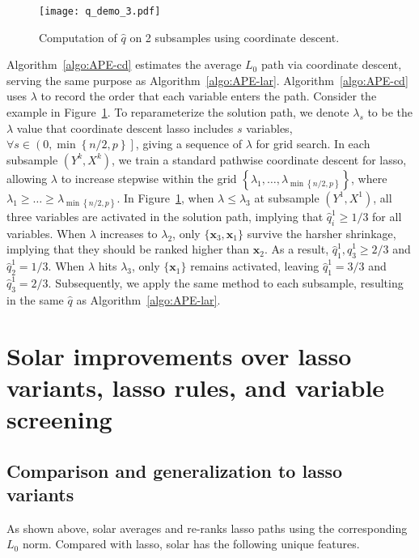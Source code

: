 \documentclass[11pt,review,authoryear]{elsarticle}
\begin{document}
\begin{figure}[h]
  \centering
  \texttt{[image: q\_demo\_3.pdf]}
  \caption{Computation of $\widehat{q}$ on 2 subsamples using coordinate descent.}
  \label{fig:q_demo_3}
\end{figure}

Algorithm~\ref{algo:APE-cd} estimates the average $L_0$ path via coordinate descent, serving the same purpose as Algorithm~\ref{algo:APE-lar}. Algorithm~\ref{algo:APE-cd} uses $\lambda$ to record the order that each variable enters the path. Consider the example in Figure~\ref{fig:q_demo_3}. To reparameterize the solution path, we denote $\lambda_s$ to be the $\lambda$ value that coordinate descent lasso includes $s$ variables, $\forall s\in \left( 0, \min \left\{ n/2, p \right\} \right]$, giving a sequence of $\lambda$ for grid search. In each subsample $\left( Y^k, X^k \right)$, we train a standard pathwise coordinate descent for lasso, allowing $\lambda$ to increase stepwise within the grid $\left\{\lambda_1, \ldots, \lambda_{ \min \left\{ n/2, p \right\} } \right\}$, where $\lambda_1 \geqslant \ldots \geqslant \lambda_{ \min \left\{ n/2, p \right\} }$. In Figure~\ref{fig:q_demo_3}, when $\lambda \leqslant \lambda_3$ at subsample $\left( Y^1, X^1 \right)$, all three variables are activated in the solution path, implying that $\widehat{q}^1_i \geqslant 1/3$ for all variables. When $\lambda$ increases to $\lambda_2$, only $\{\mathbf{x}_3, \mathbf{x}_1\}$ survive the harsher shrinkage, implying that they should be ranked higher than $\mathbf{x}_2$. As a result, $\widehat{q}^1_1, \widehat{q}^1_3 \geqslant 2/3$ and $\widehat{q}^1_2 = 1/3$. When $\lambda$ hits $\lambda_3$, only $\{\mathbf{x}_1\}$ remains activated, leaving $\widehat{q}^1_1 = 3/3$ and $\widehat{q}^1_3 = 2/3$. Subsequently, we apply the same method to each subsample, resulting in the same $\widehat{q}$ as Algorithm~\ref{algo:APE-lar}.

\section{Solar improvements over lasso variants, lasso rules, and variable screening \label{section:adv}}

\subsection{Comparison and generalization to lasso variants}

As shown above, solar averages and re-ranks lasso paths using the corresponding $L_0$ norm. Compared with lasso, solar has the following unique features.
\end{document}
